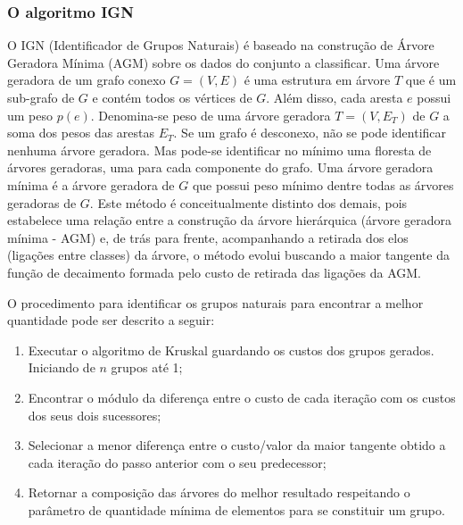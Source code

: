 \subsubsection{O algoritmo IGN}
 \label{sub:ign}
O IGN (Identificador de Grupos Naturais) \cite{ign} é baseado na construção de Árvore Geradora Mínima (AGM) sobre os dados do conjunto a classificar. Uma árvore geradora de um grafo conexo ${G = (V, E)}$ é uma estrutura em árvore ${T}$ que é um sub-grafo de ${G}$ e contém todos os vértices de ${G}$. Além disso, cada aresta ${e}$ possui um peso ${p(e)}$. Denomina-se peso de uma árvore geradora ${T=(V,E_T)}$ de ${G}$ a soma dos pesos das arestas ${E_T}$. Se um grafo é desconexo, não se pode identificar nenhuma árvore geradora. Mas pode-se identificar no mínimo uma floresta de árvores geradoras, uma para cada componente do grafo. Uma árvore geradora mínima é a árvore geradora de ${G}$ que possui peso mínimo dentre todas as árvores geradoras de ${G}$.
Este método é conceitualmente distinto dos demais, pois estabelece uma relação entre a construção da árvore hierárquica (árvore geradora mínima - AGM) e, de trás para frente, acompanhando a retirada dos elos (ligações entre classes) da árvore, o método evolui buscando a maior tangente da função de decaimento formada pelo custo de retirada das ligações da AGM.

O procedimento para identificar os grupos naturais para encontrar a melhor quantidade pode ser descrito a seguir:
 \begin{enumerate}
\item Executar o algoritmo de Kruskal guardando os custos dos grupos gerados. Iniciando de ${n}$ grupos até 1;
\item Encontrar o módulo da diferença entre o custo de cada iteração com os custos dos seus dois sucessores;
\item Selecionar a menor diferença entre o custo/valor da maior tangente obtido a cada iteração do passo anterior com o seu predecessor;
\item Retornar a composição das árvores do melhor resultado respeitando o parâmetro de quantidade mínima de elementos para se constituir um grupo.
\end{enumerate}

